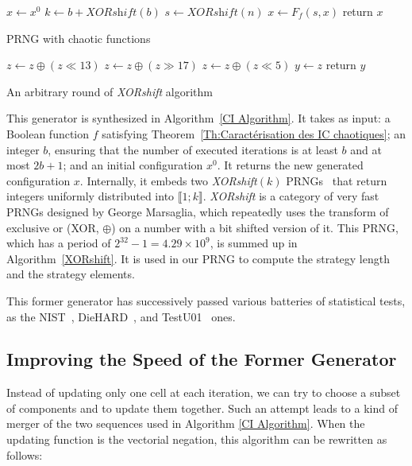 \documentclass{article}
\begin{document}
\begin{algorithm}[h!]
$x\leftarrow x^0$\;
$k\leftarrow b + \textit{XORshift}(b)$\;
{
$s\leftarrow{\textit{XORshift}(n)}$\;
$x\leftarrow{F_f(s,x)}$\;
}
return $x$\;
\caption{PRNG with chaotic functions}
\label{CI Algorithm}
\end{algorithm}

\begin{algorithm}[h!]
$z\leftarrow{z\oplus{(z\ll13)}}$\;
$z\leftarrow{z\oplus{(z\gg17)}}$\;
$z\leftarrow{z\oplus{(z\ll5)}}$\;
$y\leftarrow{z}$\;
return $y$\;
\medskip
\caption{An arbitrary round of \textit{XORshift} algorithm}
\label{XORshift}
\end{algorithm}





This generator is synthesized in Algorithm~\ref{CI Algorithm}.
It takes as input: a Boolean function $f$ satisfying Theorem~\ref{Th:Caractérisation   des   IC   chaotiques};
an integer $b$, ensuring that the number of executed iterations is at least $b$
and at most $2b+1$; and an initial configuration $x^0$.
It returns the new generated configuration $x$.  Internally, it embeds two
\textit{XORshift}$(k)$ PRNGs~\cite{Marsaglia2003} that return integers
uniformly distributed
into $\llbracket 1 ; k \rrbracket$.
\textit{XORshift} is a category of very fast PRNGs designed by George Marsaglia,
which repeatedly uses the transform of exclusive or (XOR, $\oplus$) on a number
with a bit shifted version of it. This PRNG, which has a period of
$2^{32}-1=4.29\times10^9$, is summed up in Algorithm~\ref{XORshift}. It is used
in our PRNG to compute the strategy length and the strategy elements.

This former generator has successively passed various batteries of statistical tests, as the NIST~\cite{bcgr11:ip}, DieHARD~\cite{Marsaglia1996}, and TestU01~\cite{LEcuyerS07} ones.

\subsection{Improving the Speed of the Former Generator}

Instead of updating only one cell at each iteration, we can try to choose a
subset of components and to update them together. Such an attempt leads
to a kind of merger of the two sequences used in Algorithm 
\ref{CI Algorithm}. When the updating function is the vectorial negation,
this algorithm can be rewritten as follows:
\end{document}
